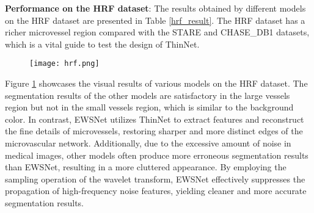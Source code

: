 \documentclass[a4paper,fleqn]{cas-dc}
\begin{document}
\textbf{Performance on the HRF dataset}: 
The results obtained by different models on the HRF dataset are presented in Table \ref{hrf_result}. The HRF dataset has a richer microvessel region compared with the STARE and CHASE\_DB1 datasets, which is a vital guide to test the design of ThinNet. 
\begin{figure}[ht!]
	\centering\texttt{[image: hrf.png]}
	\caption{}
	\label{result_pic_hrf}
\end{figure}
Figure \ref{result_pic_hrf} showcases the visual results of various models on the HRF dataset. The segmentation results of the other models are satisfactory in the large vessels region but not in the small vessels region, which is similar to the background color. In contrast, EWSNet utilizes ThinNet to extract features and reconstruct the fine details of microvessels, restoring sharper and more distinct edges of the microvascular network. Additionally, due to the excessive amount of noise in medical images, other models often produce more erroneous segmentation results than EWSNet, resulting in a more cluttered appearance. By employing the sampling operation of the wavelet transform, EWSNet effectively suppresses the propagation of high-frequency noise features, yielding cleaner and more accurate segmentation results.
\end{document}
